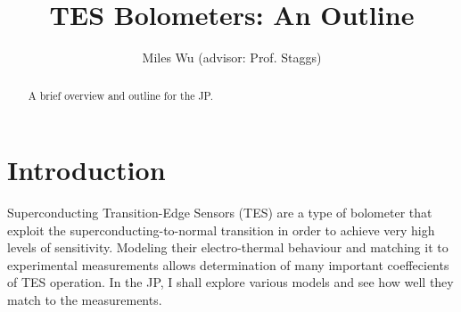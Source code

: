 \documentclass[letterpaper,10pt]{article}
\begin{document}
\title{TES Bolometers: An Outline }
\author{Miles Wu (advisor: Prof. Staggs)}
\maketitle

\begin{abstract}
A brief overview and outline for the JP.
\end{abstract}

\section{Introduction}
Superconducting Transition-Edge Sensors (TES) are a type of bolometer that exploit the superconducting-to-normal transition in order to achieve very high levels of sensitivity. Modeling their electro-thermal behaviour and matching it to experimental measurements allows determination of many important coeffecients of TES operation. In the JP, I shall explore various models and see how well they match to the measurements.
\end{document}
